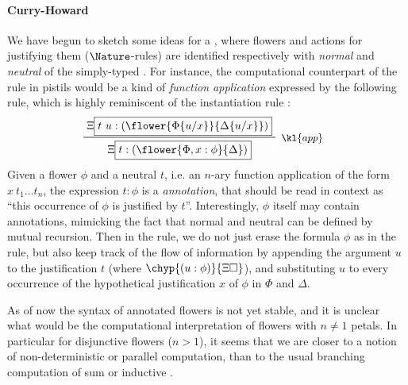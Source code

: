 \begin{scope}
\paragraph{Curry-Howard}

We have begun to sketch some ideas for a , where
flowers and \Proof actions for justifying them ($\Nature$-rules) are identified
respectively with \emph{normal} and \emph{neutral}  of the simply-typed
. For instance, the computational counterpart of the rule
 in pistils would be a kind of \emph{function application}
expressed by the following  rule, which is highly reminiscent of the
instantiation rule :
$$
\R[\kl{app}]
  {\Xi\select{t~u : (\flower{\subst{\Phi}{u}{x}}{\subst{\Delta}{u}{x}})}}
  {\Xi\select{t : (\flower{\Phi, x : \phi}{\Delta})}}
$$
Given a flower $\phi$ and a neutral  $t$, i.e. an $n$-ary function
application of the form $x~t_1 \ldots t_n$, the expression $t : \phi$ is a
\emph{ annotation}, that should be read in context as ``this occurrence of
$\phi$ is justified by $t$''. Interestingly, $\phi$ itself may contain 
annotations, mimicking the fact that normal and neutral  can be defined by
mutual recursion. Then in the  rule, we do not just erase the formula
$\phi$ as in the  rule, but also keep track of the flow of
information by appending the argument $u$ to the justification $t$ (where
$\chyp{(u : \phi)}{\Xi\hole}$), and substituting $u$ to every occurrence of the
hypothetical justification $x$ of $\phi$ in $\Phi$ and $\Delta$.

As of now the syntax of annotated flowers is not yet stable, and it is unclear
what would be the computational interpretation of flowers with $n \not= 1$
petals. In particular for disjunctive flowers ($n > 1$), it seems that we are
closer to a notion of non-deterministic or parallel computation, than to the
usual branching computation of sum or inductive .


\end{scope}
